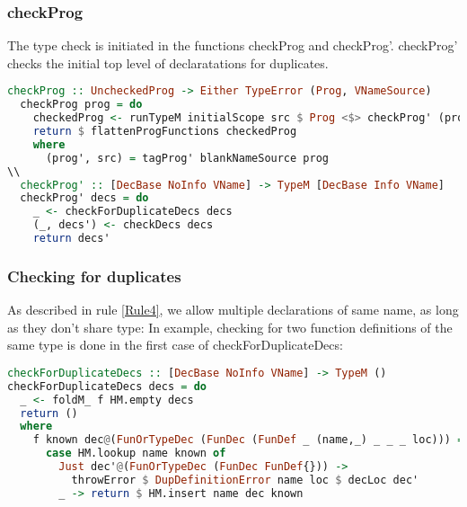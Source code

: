 \subsubsection{checkProg}
The type check is initiated in the functions checkProg and checkProg'.
checkProg' checks the initial top level of declaratations for duplicates.
\begin{lstlisting}[language=Haskell]
  checkProg :: UncheckedProg -> Either TypeError (Prog, VNameSource)
  checkProg prog = do
    checkedProg <- runTypeM initialScope src $ Prog <$> checkProg' (progDecs prog')
    return $ flattenProgFunctions checkedProg
    where
      (prog', src) = tagProg' blankNameSource prog
\\  
  checkProg' :: [DecBase NoInfo VName] -> TypeM [DecBase Info VName]
  checkProg' decs = do
    _ <- checkForDuplicateDecs decs
    (_, decs') <- checkDecs decs
    return decs'
\end{lstlisting}
\subsubsection{Checking for duplicates}
\label{subsec:checkingforduplicates}
As described in rule \ref{Rule4}, we allow multiple declarations of same name,
as long as they don't share type:
In example, checking for two function definitions of the same type is done in
the first case of checkForDuplicateDecs:
\begin{lstlisting}[language=Haskell]
checkForDuplicateDecs :: [DecBase NoInfo VName] -> TypeM ()
checkForDuplicateDecs decs = do
  _ <- foldM_ f HM.empty decs
  return ()
  where
    f known dec@(FunOrTypeDec (FunDec (FunDef _ (name,_) _ _ _ loc))) =
      case HM.lookup name known of
        Just dec'@(FunOrTypeDec (FunDec FunDef{})) ->
          throwError $ DupDefinitionError name loc $ decLoc dec'
        _ -> return $ HM.insert name dec known
\end{lstlisting}
